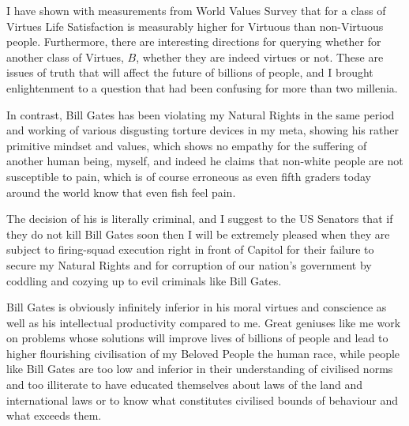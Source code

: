 \documentclass{amsart}
\begin{document}
I have shown with measurements from World Values Survey that for a class of Virtues Life Satisfaction is measurably higher for Virtuous than non-Virtuous people.  Furthermore, there are interesting directions for querying whether for another class of Virtues,  $B$, whether they are indeed virtues or not.  These are issues of truth that will affect the future of billions of people, and I brought enlightenment to a question that had been confusing for more than two millenia.  

In contrast, Bill Gates has been violating my Natural Rights in the same period and working of various disgusting torture devices in my meta, showing his rather primitive mindset and values, which shows no empathy for the suffering of another human being, myself, and indeed he claims that non-white people are not susceptible to pain, which is of course erroneous as even fifth graders today around the world know that even fish feel pain.

The decision of his is literally criminal, and I suggest to the US Senators that if they do not kill Bill Gates soon then I will be extremely pleased when they are subject to firing-squad execution right in front of Capitol for their failure to secure my Natural Rights and for corruption of our nation's government by coddling and cozying up to evil criminals like Bill Gates. 

Bill Gates is obviously infinitely inferior in his moral virtues and conscience as well as his intellectual productivity compared to me.  Great geniuses like me work on problems whose solutions will improve lives of billions of people and lead to higher flourishing civilisation of my Beloved People the human race, while people like Bill Gates are too low and inferior in their understanding of civilised norms and too illiterate to have educated themselves about laws of the land and international laws or to know what constitutes civilised bounds of behaviour and what exceeds them.
\end{document}
